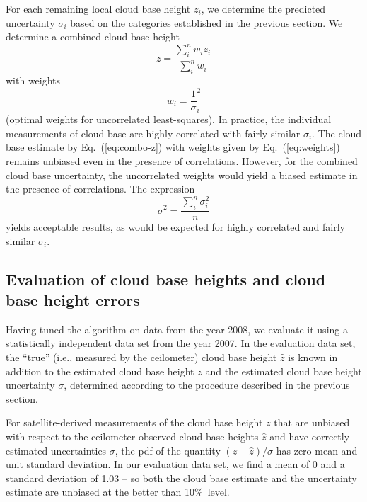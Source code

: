 \documentclass[amt,manuscript]{copernicus}\usepackage[]{graphicx}\usepackage[]{color}
\begin{document}
For each remaining local cloud base height $z_i$, we determine the predicted
uncertainty $\sigma_i$ based on the categories established in the previous
section.  We determine a combined cloud base height
\begin{equation}
  \label{eq:combo-z}
  z = \frac{\sum\limits_i^n w_i z_i}{\sum\limits_i^n w_i}
\end{equation}
with weights
\begin{equation}
  \label{eq:weights}
  w_i = \frac 1 \sigma_i^2
\end{equation}
(optimal weights for uncorrelated least-squares).  In practice, the individual
measurements of cloud base are highly correlated with fairly similar
$\sigma_i$.  The cloud base estimate by Eq.~(\ref{eq:combo-z}) with weights
given by Eq.~(\ref{eq:weights}) remains unbiased even in the presence of
correlations.  However, for the combined cloud base uncertainty,
the uncorrelated weights would yield a biased estimate in the presence of
correlations.  The expression
\begin{equation}
  \label{eq:combo-sigma}
  \sigma^2 = \frac{\sum\limits_i^n \sigma_i^2}{n}
\end{equation}
yields acceptable results, as would be expected for highly correlated and fairly
similar $\sigma_i$.

\subsection{Evaluation of cloud base heights and cloud base height errors}
\label{sec:algorithm:eval}




Having tuned the algorithm on data from the year 2008, we evaluate it using a
statistically independent data set from the year 2007.  In the evaluation data
set, the ``true'' (i.e., measured by the ceilometer) cloud base height $\hat{z}$
is known in addition to the estimated cloud base height $z$ and the estimated
cloud base height uncertainty $\sigma$, determined according to the procedure
described in the previous section.

For satellite-derived measurements of the cloud base height $z$ that are
unbiased with respect to the ceilometer-observed cloud base heights $\hat{z}$
and have correctly estimated uncertainties $\sigma$, the pdf of the quantity
$(z - \hat{z})/\sigma$ has zero mean and unit standard deviation. In our
evaluation data set, we find a mean of 0 and a standard deviation of 1.03 -- so both the cloud base estimate and
the uncertainty estimate are unbiased at the better than 10\%\ level.
\end{document}
